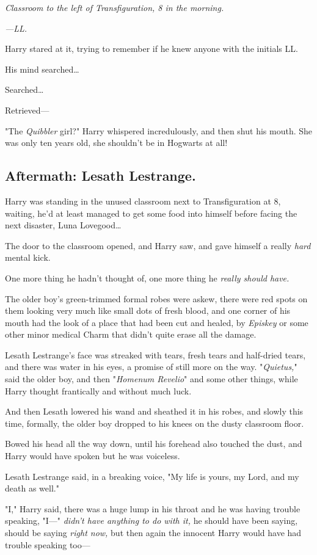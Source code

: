 \emph{Classroom to the left of Transfiguration, 8 in the morning.}

\emph{---LL.}

Harry stared at it, trying to remember if he knew anyone with the initials LL.

His mind searched{\ldots}

Searched{\ldots}

Retrieved---

"The \emph{Quibbler} girl?" Harry whispered incredulously, and then shut his 
mouth. She was only ten years old, she shouldn't be in Hogwarts at all!
\sbreak
\subsection{Aftermath: Lesath Lestrange.}

Harry was standing in the unused classroom next to Transfiguration at 8\AM, 
waiting, he'd at least managed to get some food into himself before facing the 
next disaster, Luna Lovegood{\ldots}

The door to the classroom opened, and Harry saw, and gave himself a really 
\emph{hard} mental kick.

One more thing he hadn't thought of, one more thing he \emph{really should 
have.}

The older boy's green-trimmed formal robes were askew, there were red spots on 
them looking very much like small dots of fresh blood, and one corner of his 
mouth had the look of a place that had been cut and healed, by \emph{Episkey} 
or some other minor medical Charm that didn't quite erase all the damage.

Lesath Lestrange's face was streaked with tears, fresh tears and half-dried 
tears, and there was water in his eyes, a promise of still more on the way. 
"\emph{Quietus,}" said the older boy, and then "\emph{Homenum Revelio}" and 
some other things, while Harry thought frantically and without much luck.

And then Lesath lowered his wand and sheathed it in his robes, and slowly this 
time, formally, the older boy dropped to his knees on the dusty classroom floor.

Bowed his head all the way down, until his forehead also touched the dust, and 
Harry would have spoken but he was voiceless.

Lesath Lestrange said, in a breaking voice, "My life is yours, my Lord, and my 
death as well."

"I," Harry said, there was a huge lump in his throat and he was having trouble 
speaking, "I---" \emph{didn't have anything to do with it,} he should have been 
saying, should be saying \emph{right now,} but then again the innocent Harry 
would have had trouble speaking too---

